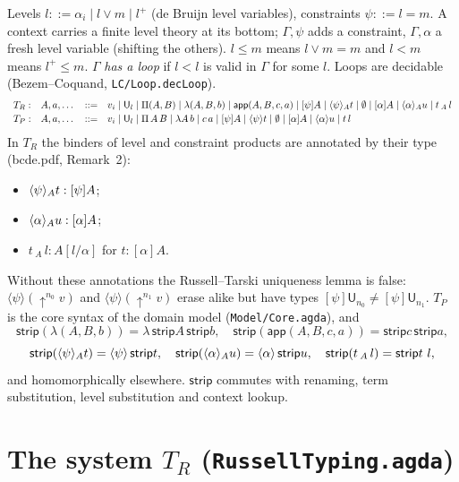 \documentclass[10pt]{article}
\newcommand{\U}{\mathsf{U}}
\newcommand{\lam}{\lambda}
\newcommand{\app}{\mathsf{app}}
\newcommand{\strip}{\mathsf{strip}}
\newcommand{\TR}{T_R}
\newcommand{\TP}{T_P}
\newcommand{\Emp}{\emptyset}
\newcommand{\grd}[2]{[#1]#2}
\newcommand{\glam}[2]{\langle #1\rangle #2}
\newcommand{\lpi}[1]{[\alpha]#1}
\newcommand{\llam}[1]{\langle\alpha\rangle #1}
\newcommand{\up}{{\uparrow}}
\newcommand{\agda}[1]{\texttt{#1}}
\theoremstyle{remark}
\begin{document}
Levels $l ::= \alpha_i \mid l\vee m \mid l^+$ (de Bruijn level variables),
constraints $\psi ::= l=m$.  A context carries a finite level theory at its
bottom; $\Gamma,\psi$ adds a constraint, $\Gamma,\alpha$ a fresh level
variable (shifting the others).  $l\le m$ means $l\vee m=m$ and $l<m$ means
$l^+\le m$.  $\Gamma$ \emph{has a loop} if $l<l$ is valid in $\Gamma$ for some
$l$.  Loops are decidable (Bezem--Coquand, \agda{LC/Loop.decLoop}).
\[
\begin{array}{lrcl}
\TR: & A,a,\dots & ::= & v_i \mid \U_l \mid \Pi(A,B) \mid \lam(A,B,b) \mid \app(A,B,c,a)
  \mid \grd\psi A \mid \glam\psi_A t \mid \Emp \mid \lpi A \mid \llam_A u \mid t\,{}_A\,l\\[2pt]
\TP: & A,a,\dots & ::= & v_i \mid \U_l \mid \Pi\,A\,B \mid \lam A\, b \mid c\,a
  \mid \grd\psi A \mid \glam\psi t \mid \Emp \mid \lpi A \mid \llam u \mid t\,l
\end{array}
\]
In $\TR$ the binders of level and constraint products are annotated by their
type (bcde.pdf, Remark~2):
\begin{itemize}
\item $\glam\psi_A t:\grd\psi A$;
\item $\llam_A u:\lpi A$;
\item $t\,{}_A\,l:A[l/\alpha]$ for $t:\lpi A$.
\end{itemize}
Without these annotations the Russell--Tarski uniqueness lemma is false:
$\glam\psi(\up^{n_0}v)$ and $\glam\psi(\up^{n_1}v)$ erase alike but have
types $\grd\psi\U_{n_0}\ne\grd\psi\U_{n_1}$.  $\TP$ is the core syntax of the
domain model (\agda{Model/Core.agda}), and
\[
\strip(\lam(A,B,b))=\lam\,\strip A\,\strip b,\quad
\strip(\app(A,B,c,a))=\strip c\,\strip a,
\]
\[
\strip(\glam\psi_A t)=\glam\psi\,\strip t,\quad
\strip(\llam_A u)=\llam\,\strip u,\quad
\strip(t\,{}_A\,l)=\strip t\ l ,
\]
and homomorphically elsewhere.  $\strip$ commutes with renaming, term
substitution, level substitution and context lookup.

\section{The system $\TR$ (\agda{RussellTyping.agda})}
\end{document}
